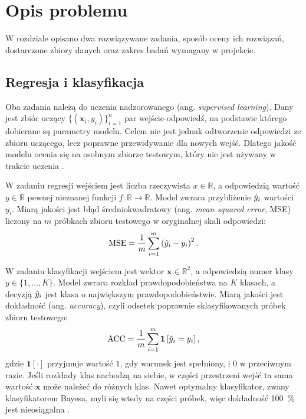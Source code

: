 \section{Opis problemu}
\label{sec:problem}

W rozdziale opisano dwa rozwiązywane zadania, sposób oceny ich rozwiązań, dostarczone zbiory danych oraz zakres badań wymagany w projekcie.

\subsection{Regresja i klasyfikacja}
\label{sec:problem-tasks}

Oba zadania należą do uczenia nadzorowanego (ang. \textit{supervised learning}). Dany jest zbiór uczący $\{(\mathbf{x}_i, y_i)\}_{i=1}^{n}$ par wejście-odpowiedź, na podstawie którego dobierane są parametry modelu. Celem nie jest jednak odtworzenie odpowiedzi ze zbioru uczącego, lecz poprawne przewidywanie dla nowych wejść. Dlatego jakość modelu ocenia się na osobnym zbiorze testowym, który nie jest używany w trakcie uczenia \cite{goodfellow2016}.

W zadaniu regresji wejściem jest liczba rzeczywista $x \in \mathbb{R}$, a odpowiedzią wartość $y \in \mathbb{R}$ pewnej nieznanej funkcji $f \colon \mathbb{R} \to \mathbb{R}$. Model zwraca przybliżenie $\hat{y}_i$ wartości $y_i$. Miarą jakości jest błąd średniokwadratowy (ang. \textit{mean squared error}, MSE) liczony na $m$ próbkach zbioru testowego w oryginalnej skali odpowiedzi:
\begin{equation}
    \mathrm{MSE} = \frac{1}{m} \sum_{i=1}^{m} \left( \hat{y}_i - y_i \right)^2 .
    \label{eq:mse}
\end{equation}

W zadaniu klasyfikacji wejściem jest wektor $\mathbf{x} \in \mathbb{R}^2$, a odpowiedzią numer klasy $y \in \{1, \dots, K\}$. Model zwraca rozkład prawdopodobieństwa na $K$ klasach, a decyzją $\hat{y}_i$ jest klasa o największym prawdopodobieństwie. Miarą jakości jest dokładność (ang. \textit{accuracy}), czyli odsetek poprawnie sklasyfikowanych próbek zbioru testowego:
\begin{equation}
    \mathrm{ACC} = \frac{1}{m} \sum_{i=1}^{m} \mathbf{1}\left[ \hat{y}_i = y_i \right] ,
    \label{eq:accuracy}
\end{equation}
gdzie $\mathbf{1}[\cdot]$ przyjmuje wartość $1$, gdy warunek jest spełniony, i $0$ w przeciwnym razie. Jeśli rozkłady klas nachodzą na siebie, w części przestrzeni wejść ta sama wartość $\mathbf{x}$ może należeć do różnych klas. Nawet optymalny klasyfikator, zwany klasyfikatorem Bayesa, myli się wtedy na części próbek, więc dokładność \qty{100}{\percent} jest nieosiągalna \cite{bishop2006}.

